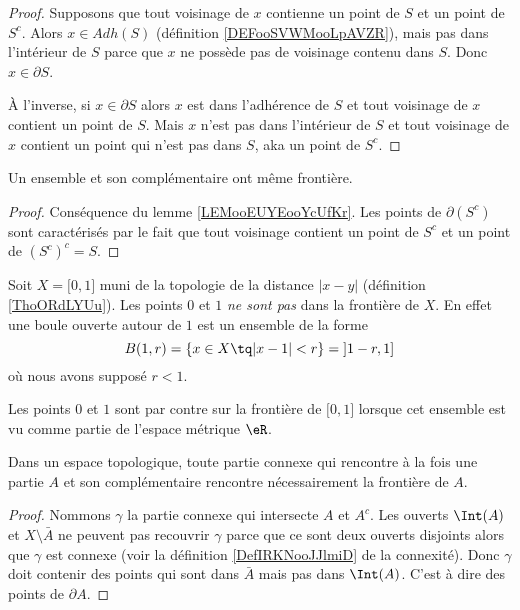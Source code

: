 \begin{proof}
    Supposons que tout voisinage de \( x\) contienne un point de \( S\) et un point de \( S^c\). Alors \( x\in Adh(S)\) (définition \ref{DEFooSVWMooLpAVZR}), mais pas dans l'intérieur de \( S\) parce que \( x\) ne possède pas de voisinage contenu dans \( S\). Donc \( x\in \partial S\).

    À l'inverse, si \( x\in\partial S\) alors \( x\) est dans l'adhérence de \( S\) et tout voisinage de \( x\) contient un point de \( S\). Mais \( x\) n'est pas dans l'intérieur de \( S\) et tout voisinage de \( x\) contient un point qui n'est pas dans \( S\), aka un point de \( S^c\).
\end{proof}

\begin{corollary}
    Un ensemble et son complémentaire ont même frontière.
\end{corollary}

\begin{proof}
    Conséquence du lemme \ref{LEMooEUYEooYcUfKr}. Les points de \( \partial(S^c)\) sont caractérisés par le fait que tout voisinage contient un point de \( S^c\) et un point de \( (S^c)^c=S\).
\end{proof}

\begin{example}
    Soit \( X=\mathopen[ 0 , 1 \mathclose]\) muni de la topologie de la distance \( | x-y |\) (définition \ref{ThoORdLYUu}). Les points \( 0\) et \( 1\) \emph{ne sont pas} dans la frontière de $X$. En effet une boule ouverte autour de \( 1\) est un ensemble de la forme
    \begin{equation}
        B(1,r)=\{ x\in X\tq | x-1 |<r \}=\mathopen] 1-r , 1 \mathclose]
    \end{equation}
    où nous avons supposé \( r<1\).

    Les points \( 0\) et \( 1\) sont par contre sur la frontière de \( \mathopen[ 0 , 1 \mathclose]\) lorsque cet ensemble est vu comme partie de l'espace métrique \( \eR\).
\end{example}

\begin{lemma}        \label{LEMooLKWEooItGnkP}
    Dans un espace topologique, toute partie connexe qui rencontre à la fois une partie \( A\) et son complémentaire rencontre nécessairement la frontière de \( A\).
\end{lemma}

\begin{proof}
    Nommons \( \gamma\) la partie connexe qui intersecte \( A\) et \( A^c\). Les ouverts \( \Int(A)\) et \( X\setminus \bar A\) ne peuvent pas recouvrir \( \gamma\) parce que ce sont deux ouverts disjoints alors que \( \gamma\) est connexe (voir la définition \ref{DefIRKNooJJlmiD} de la connexité). Donc \( \gamma\) doit contenir des points qui sont dans \( \bar A\) mais pas dans \( \Int(A)\). C'est à dire des points de \( \partial A\).
\end{proof}

